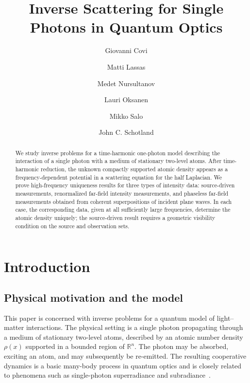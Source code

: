 \documentclass[12pt,a4paper]{amsart}
\title[Inverse Problems for Single Photons]{Inverse Scattering for Single Photons in Quantum Optics}
\author{}
\date{}
\author[Covi]{Giovanni Covi}
\author[Lassas]{Matti Lassas}
\author[Nursultanov]{Medet Nursultanov}
\author[Oksanen]{Lauri Oksanen}
\author[Salo]{Mikko Salo}
\author[Schotland]{John C. Schotland }
\numberwithin{equation}{section}
\theoremstyle{plain}
\theoremstyle{definition}
\begin{document}
\begin{abstract}
We study inverse problems for a time-harmonic one-photon model describing the interaction of a single photon with a medium of stationary two-level atoms.
After time-harmonic reduction, the unknown compactly supported atomic density
appears as a frequency-dependent potential in a scattering equation for the half Laplacian. We prove high-frequency uniqueness results for three types of intensity data: source-driven measurements, renormalized far-field
intensity measurements, and phaseless far-field measurements obtained from
coherent superpositions of incident plane waves. In each case, the
corresponding data, given at all sufficiently large frequencies, determine
the atomic density uniquely; the source-driven result requires a geometric
visibility condition on the source and observation sets.
\end{abstract}



\maketitle
\tableofcontents

    
\section{Introduction}
\subsection{Physical motivation and the model}

This paper is concerned with inverse problems for a quantum model of
light--matter interactions. The physical setting is a single photon propagating
through a medium of stationary two-level atoms, described by an atomic number
density $\rho(x)$ supported in a bounded region of $\mathbb R^n$. The photon
may be absorbed, exciting an atom, and may subsequently be re-emitted. The
resulting cooperative dynamics is a basic many-body process in quantum optics
and is closely related to phenomena such as single-photon superradiance and
subradiance~\cite{Dicke_1954,Gross_1982,Kraisler_Schotland}.
\end{document}
